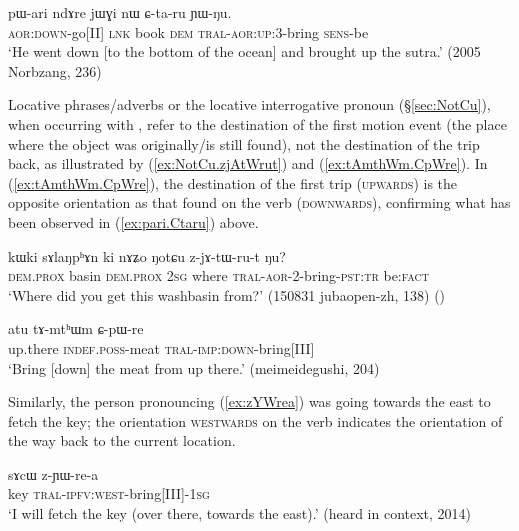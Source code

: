 \begin{exe}
\ex \label{ex:pari.Ctaru}
\gll  pɯ-ari ndɤre jɯɣi nɯ ɕ-ta-ru ɲɯ-ŋu. \\
\textsc{aor}:\textsc{down}-go[II] \textsc{lnk} book \textsc{dem} \textsc{tral}-\textsc{aor}:\textsc{up}:3\flobv{}-bring \textsc{sens}-be \\
\glt `He went down [to the bottom of the ocean] and brought up the sutra.' (2005 Norbzang, 236)
\end{exe}

Locative phrases/adverbs or the locative interrogative pronoun  (§\ref{sec:NotCu}), when occurring with , refer to the destination of the first motion event (the place where the object was originally/is still found), not the destination of the trip back, as illustrated by (\ref{ex:NotCu.zjAtWrut}) and (\ref{ex:tAmthWm.CpWre}). In (\ref{ex:tAmthWm.CpWre}), the destination of the first trip (\textsc{upwards}) is the opposite orientation as that found on the verb (\textsc{downwards}), confirming what has been observed in (\ref{ex:pari.Ctaru}) above.

\begin{exe}
\ex \label{ex:NotCu.zjAtWrut}
\gll kɯki sɤlaŋpʰɤn ki nɤʑo ŋotɕu z-jɤ-tɯ-ru-t ŋu? \\
\textsc{dem}.\textsc{prox} basin \textsc{dem}.\textsc{prox} \textsc{2sg} where \textsc{tral}-\textsc{aor}-2-bring-\textsc{pst}:\textsc{tr} be:\textsc{fact} \\
\glt `Where did you get this washbasin from?' (150831 jubaopen-zh, 138)
()
\end{exe}

\begin{exe}
\ex \label{ex:tAmthWm.CpWre}
\gll atu tɤ-mtʰɯm ɕ-pɯ-re \\
up.there \textsc{indef}.\textsc{poss}-meat \textsc{tral}-\textsc{imp}:\textsc{down}-bring[III] \\
\glt `Bring [down] the meat from up there.' (meimeidegushi, 204)
\end{exe}

Similarly, the person pronouncing (\ref{ex:zYWrea}) was going towards the east to fetch the key; the orientation \textsc{westwards} on the verb indicates the orientation of the way back to the current location.

\begin{exe}
\ex \label{ex:zYWrea}
\gll sɤcɯ z-ɲɯ-re-a \\
key \textsc{tral}-\textsc{ipfv}:\textsc{west}-bring[III]-\textsc{1sg} \\
\glt `I will fetch the key (over there, towards the east).' (heard in context, 2014)
\end{exe}

